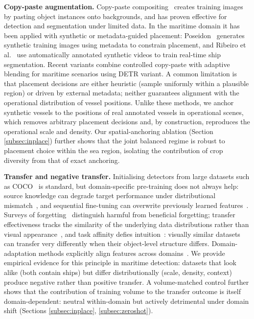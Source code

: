 \documentclass[10pt,conference]{IEEEtran}
\begin{document}
\textbf{Copy-paste augmentation.} Copy-paste compositing~\cite{ghiasi2021simple} creates training images by pasting object instances onto backgrounds, and has proven effective for detection and segmentation under limited data. In the maritime domain it has been applied with synthetic or metadata-guided placement: Poseidon~\cite{ruizponce2023poseidon} generates synthetic training images using metadata to constrain placement, and Ribeiro et al.~\cite{ribeiro2022synthetic} use automatically annotated synthetic videos to train real-time ship segmentation. Recent variants combine controlled copy-paste with adaptive blending for maritime scenarios using DETR variant\cite{nemati2025rtdetr}. A common limitation is that placement decisions are either heuristic (sample uniformly within a plausible region) or driven by external metadata; neither guarantees alignment with the operational distribution of vessel positions. Unlike these methods, we anchor synthetic vessels to the positions of real annotated vessels in operational scenes, which removes arbitrary placement decisions and, by construction, reproduces the operational scale and density. Our spatial-anchoring ablation (Section \ref{subsec:inplace}) further shows that the joint balanced regime is robust to placement choice within the sea region, isolating the contribution of crop diversity from that of exact anchoring.

\textbf{Transfer and negative transfer.} Initialising detectors from large datasets such as COCO~\cite{lin2014microsoft} is standard, but domain-specific pre-training does not always help: source knowledge can degrade target performance under distributional mismatch~\cite{zhang2023negative}, and sequential fine-tuning can overwrite previously learned features~\cite{mccloskey1989catastrophic}. Surveys of forgetting~\cite{yang2024forgetting} distinguish harmful from beneficial forgetting; transfer effectiveness tracks the similarity of the underlying data distributions rather than visual appearance~\cite{cui2018large}, and task affinity defies intuition~\cite{zamir2018taskonomy}: visually similar datasets can transfer very differently when their object-level structure differs. Domain-adaptation methods explicitly align features across domains~\cite{chen2018domain}. We provide empirical evidence for this principle in maritime detection: datasets that look alike (both contain ships) but differ distributionally (scale, density, context) produce negative rather than positive transfer. A volume-matched control further shows that the contribution of training volume to the transfer outcome is itself domain-dependent: neutral within-domain but actively detrimental under domain shift (Sections \ref{subsec:inplace}, \ref{subsec:zeroshot}).
\end{document}
